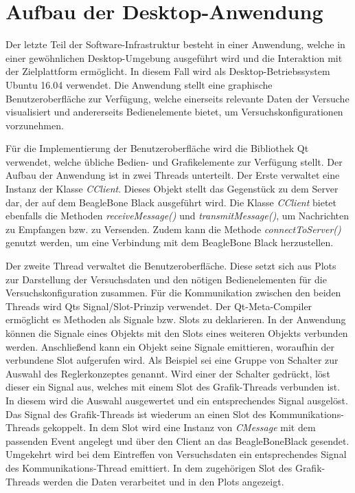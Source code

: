 \section{Aufbau der Desktop-Anwendung}
Der letzte Teil der Software-Infrastruktur besteht in einer Anwendung, welche in einer gewöhnlichen Desktop-Umgebung ausgeführt wird und die Interaktion mit der Zielplattform ermöglicht. In diesem Fall wird als Desktop-Betriebssystem Ubuntu 16.04 verwendet. Die Anwendung stellt eine graphische Benutzeroberfläche zur Verfügung, welche einerseits relevante Daten der Versuche visualisiert und andererseits Bedienelemente bietet, um Versuchskonfigurationen vorzunehmen.

Für die Implementierung der Benutzeroberfläche wird die Bibliothek Qt verwendet, welche übliche Bedien- und Grafikelemente zur Verfügung stellt. Der Aufbau der Anwendung ist in zwei Threads unterteilt. Der Erste verwaltet eine Instanz der Klasse \textit{CClient}. Dieses Objekt stellt das Gegenstück zu dem Server dar, der auf dem BeagleBone Black ausgeführt wird. Die Klasse \textit{CClient} bietet ebenfalls die Methoden \textit{receiveMessage()} und \textit{transmitMessage()}, um Nachrichten zu Empfangen bzw. zu Versenden. Zudem kann die Methode \textit{connectToServer()} genutzt werden, um eine Verbindung mit dem BeagleBone Black herzustellen.

Der zweite Thread verwaltet die Benutzeroberfläche. Diese setzt sich aus Plots zur Darstellung der Versuchsdaten und den nötigen Bedienelementen für die Versuchskonfiguration zusammen. Für die Kommunikation zwischen den beiden Threads wird Qts Signal/Slot-Prinzip verwendet. Der Qt-Meta-Compiler ermöglicht es Methoden als Signale bzw. Slots zu deklarieren. In der Anwendung können die Signale eines Objekts mit den Slots eines weiteren Objekts verbunden werden. Anschließend kann ein Objekt seine Signale emittieren, woraufhin der verbundene Slot aufgerufen wird. Als Beispiel sei eine Gruppe von Schalter zur Auswahl des Reglerkonzeptes genannt. Wird einer der Schalter gedrückt, löst dieser ein Signal aus, welches mit einem Slot des Grafik-Threads verbunden ist. In diesem wird die Auswahl ausgewertet und ein entsprechendes Signal ausgelöst. Das Signal des Grafik-Threads ist wiederum an einen Slot des Kommunikations-Threads gekoppelt. In dem Slot wird eine Instanz von \textit{CMessage} mit dem passenden Event angelegt und über den Client an das BeagleBoneBlack gesendet. Umgekehrt wird bei dem Eintreffen von Versuchsdaten ein entsprechendes Signal des Kommunikations-Thread emittiert. In dem zugehörigen Slot des Grafik-Threads werden die Daten verarbeitet und in den Plots angezeigt.